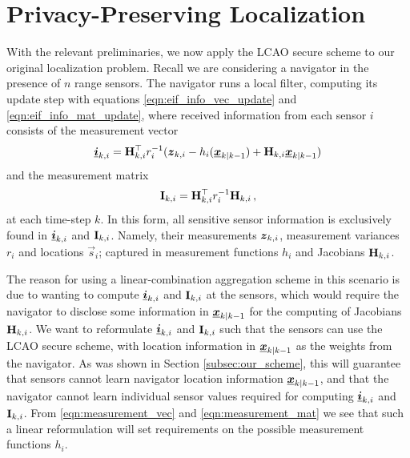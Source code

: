 \documentclass[10pt,letterpaper,oneside,twocolumn,journal]{IEEEtran}
\theoremstyle{definition}
\theoremstyle{definition}
\theoremstyle{remark}
\begin{document}
% 
%                                
%                                
%                                
% 

\section{Privacy-Preserving Localization} \label{sec:priv_localization}
With the relevant preliminaries, we now apply the LCAO secure scheme to our original localization problem. Recall we are considering a navigator in the presence of $n$ range sensors. The navigator runs a local filter, computing its update step with equations \eqref{eqn:eif_info_vec_update} and \eqref{eqn:eif_info_mat_update}, where received information from each sensor $i$ consists of the measurement vector
\begin{equation}
    \rvec{i}_{k,i} = \mat{H}^\top_{k,i} r^{-1}_i (\rv{z}_{k,i} - h_i(\rvec{x}_{k|k-1}) + \mat{H}_{k,i}\rvec{x}_{k|k-1}) \label{eqn:measurement_vec}
\end{equation}
and the measurement matrix
\begin{equation}
    \mat{I}_{k,i} = \mat{H}^\top_{k,i} r^{-1}_i \mat{H}_{k,i}\,, \label{eqn:measurement_mat}
\end{equation}
at each time-step $k$. In this form, all sensitive sensor information is exclusively found in ${\boldsymbol{\underline{i}}}_{k,i}$ and ${{\mathbf{I}}}_{k,i}$. Namely, their measurements ${\boldsymbol{z}}_{k,i}$, measurement variances $r_i$ and locations $\vec{s}_i$; captured in measurement functions $h_i$ and Jacobians ${{\mathbf{H}}}_{k,i}$. 

The reason for using a linear-combination aggregation scheme in this scenario is due to wanting to compute ${\boldsymbol{\underline{i}}}_{k,i}$ and ${{\mathbf{I}}}_{k,i}$ at the sensors, which would require the navigator to disclose some information in ${\boldsymbol{\underline{x}}}_{k|k-1}$ for the computing of Jacobians ${{\mathbf{H}}}_{k,i}$. We want to reformulate ${\boldsymbol{\underline{i}}}_{k,i}$ and ${{\mathbf{I}}}_{k,i}$ such that the sensors can use the LCAO secure scheme, with location information in ${\boldsymbol{\underline{x}}}_{k|k-1}$ as the weights from the navigator. As was shown in Section \ref{subsec:our_scheme}, this will guarantee that sensors cannot learn navigator location information ${\boldsymbol{\underline{x}}}_{k|k-1}$, and that the navigator cannot learn individual sensor values required for computing ${\boldsymbol{\underline{i}}}_{k,i}$ and ${{\mathbf{I}}}_{k,i}$. From \eqref{eqn:measurement_vec} and \eqref{eqn:measurement_mat} we see that such a linear reformulation will set requirements on the possible measurement functions $h_i$. 
\end{document}
